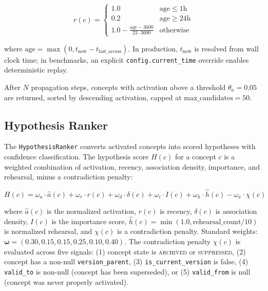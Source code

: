 \documentclass[11pt,twocolumn]{article}
\begin{document}
\begin{equation}
r(c) = \begin{cases}
1.0 & \text{age} \leq 1\text{h} \\
0.2 & \text{age} \geq 24\text{h} \\
1.0 - \frac{\text{age} - 3600}{23 \cdot 3600} & \text{otherwise}
\end{cases}
\label{eq:recency}
\end{equation}

where $\text{age} = \max(0, t_{\text{now}} - t_{\text{last\_access}})$. In production, $t_{\text{now}}$ is resolved from wall clock time; in benchmarks, an explicit \texttt{config.current\_time} override enables deterministic replay.

After $N$ propagation steps, concepts with activation above a threshold $\theta_a = 0.05$ are returned, sorted by descending activation, capped at $\text{max\_candidates} = 50$.

\subsection{Hypothesis Ranker}

The \texttt{HypothesisRanker} converts activated concepts into scored hypotheses with confidence classification. The hypothesis score $H(c)$ for a concept $c$ is a weighted combination of activation, recency, association density, importance, and rehearsal, minus a contradiction penalty:

\begin{equation}
H(c) = \omega_a \cdot \hat{a}(c) + \omega_r \cdot r(c) + \omega_d \cdot \delta(c) + \omega_i \cdot I(c) + \omega_h \cdot \hat{h}(c) - \omega_x \cdot \chi(c)
\label{eq:hypothesis}
\end{equation}

where $\hat{a}(c)$ is the normalized activation, $r(c)$ is recency, $\delta(c)$ is association density, $I(c)$ is the importance score, $\hat{h}(c) = \min(1.0, \text{rehearsal\_count} / 10)$ is normalized rehearsal, and $\chi(c)$ is a contradiction penalty. Standard weights: $\boldsymbol{\omega} = (0.30, 0.15, 0.15, 0.25, 0.10, 0.40)$. The contradiction penalty $\chi(c)$ is evaluated across five signals: (1) concept state is \textsc{archived} or \textsc{suppressed}, (2) concept has a non-null \texttt{version\_parent}, (3) \texttt{is\_current\_version} is false, (4) \texttt{valid\_to} is non-null (concept has been superseded), or (5) \texttt{valid\_from} is null (concept was never properly activated).
\end{document}

